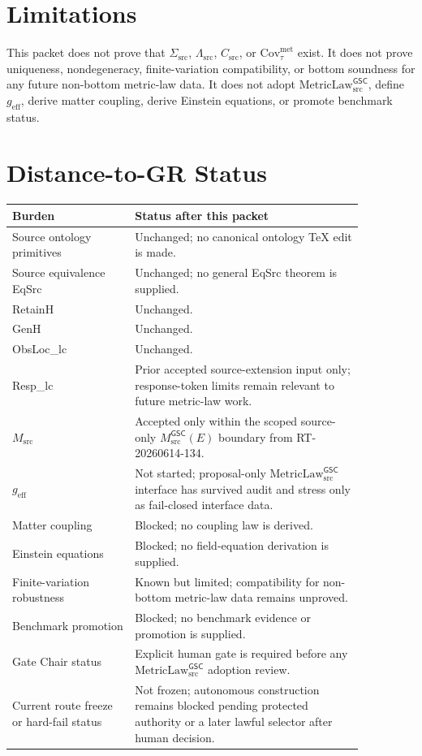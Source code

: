 \documentclass[11pt]{article}
\newcommand{\Msrc}{M_{\mathrm{src}}}
\newcommand{\MsrcGSC}{M_{\mathrm{src}}^{\mathsf{GSC}}}
\newcommand{\MetricLaw}{\mathrm{MetricLaw}_{\mathrm{src}}^{\mathsf{GSC}}}
\newcommand{\geff}{g_{\mathrm{eff}}}
\begin{document}
\section{Limitations}

This packet does not prove that \(\Sigma_{\mathrm{src}}\),
\(\Lambda_{\mathrm{src}}\), \(C_{\mathrm{src}}\), or
\(\mathrm{Cov}_{\tau}^{\mathrm{met}}\) exist. It does not prove uniqueness,
nondegeneracy, finite-variation compatibility, or bottom soundness for any
future non-bottom metric-law data. It does not adopt \(\MetricLaw\), define
\(\geff\), derive matter coupling, derive Einstein equations, or promote
benchmark status.

\section{Distance-to-GR Status}

\begin{longtable}{p{0.30\linewidth}p{0.56\linewidth}}
\toprule
Burden & Status after this packet \\
\midrule
Source ontology primitives & Unchanged; no canonical ontology TeX edit is made. \\
Source equivalence EqSrc & Unchanged; no general EqSrc theorem is supplied. \\
RetainH & Unchanged. \\
GenH & Unchanged. \\
ObsLoc\_lc & Unchanged. \\
Resp\_lc & Prior accepted source-extension input only; response-token limits remain relevant to future metric-law work. \\
\(\Msrc\) & Accepted only within the scoped source-only \(\MsrcGSC(E)\) boundary from RT-20260614-134. \\
\(\geff\) & Not started; proposal-only \(\MetricLaw\) interface has survived audit and stress only as fail-closed interface data. \\
Matter coupling & Blocked; no coupling law is derived. \\
Einstein equations & Blocked; no field-equation derivation is supplied. \\
Finite-variation robustness & Known but limited; compatibility for non-bottom metric-law data remains unproved. \\
Benchmark promotion & Blocked; no benchmark evidence or promotion is supplied. \\
Gate Chair status & Explicit human gate is required before any \(\MetricLaw\) adoption review. \\
Current route freeze or hard-fail status & Not frozen; autonomous construction remains blocked pending protected authority or a later lawful selector after human decision. \\
\bottomrule
\end{longtable}
\end{document}
